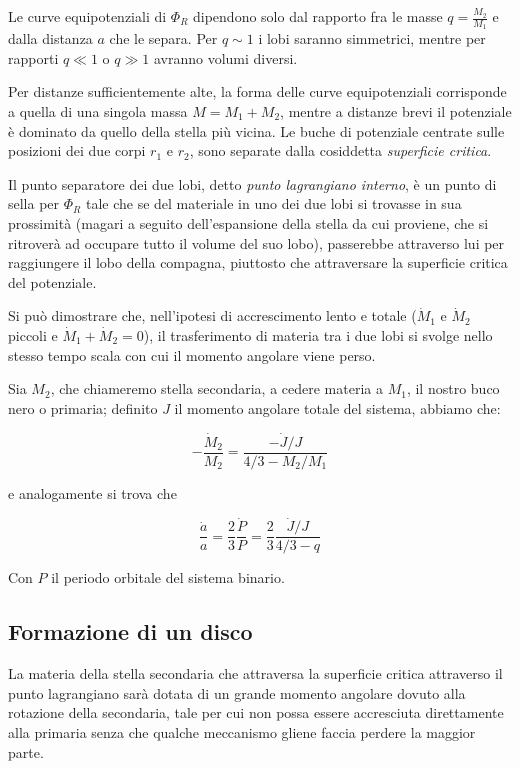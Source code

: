 \documentclass[a4paperbi]{article}
\begin{document}
	Le curve equipotenziali di $\Phi_R$ dipendono solo dal rapporto fra le masse $q=\frac{M_2}{M_1}$ e dalla distanza $a$ che le separa. Per $q\sim1$ i lobi saranno simmetrici, mentre per rapporti $q\ll1$ o $q\gg1$ avranno volumi diversi.

	Per distanze sufficientemente alte, la forma delle curve equipotenziali corrisponde a quella di una singola massa $M=M_1+M_2$, mentre a distanze brevi il potenziale è dominato da quello della stella più vicina. Le buche di potenziale centrate sulle posizioni dei due corpi $\textit{r}_1$ e $\textit{r}_2$, sono separate dalla cosiddetta \textit{superficie critica}.
	
	Il punto separatore dei due lobi, detto \textit{punto lagrangiano interno}, è un punto di sella per $\Phi_R$ tale che se del materiale in uno dei due lobi si trovasse in sua prossimità (magari a seguito dell'espansione della stella da cui proviene, che si ritroverà ad occupare tutto il volume del suo lobo), passerebbe attraverso lui per raggiungere il lobo della compagna, piuttosto che attraversare la superficie critica del potenziale.

	Si può dimostrare che, nell'ipotesi di accrescimento lento e totale ($\dot{M}_1$ e $\dot{M}_2$ piccoli e $\dot{M}_1+\dot{M}_2=0$), il trasferimento di materia tra i due lobi si svolge nello stesso tempo scala con cui il momento angolare viene perso.
	
	Sia $M_2$, che chiameremo stella secondaria, a cedere materia a $M_1$, il nostro buco nero o primaria; definito $J$ il momento angolare totale del sistema, abbiamo che:
	
	\begin{equation}
		-\frac{\dot{M}_2}{M_2}=\frac{-\dot{J}/J}{4/3-M_2/M_1}
	\end{equation}
	
	e analogamente si trova che

	\begin{equation}
		\frac{\dot{a}}{a}=\frac{2}{3}\frac{\dot{P}}{P}=\frac{2}{3}\frac{\dot{J}/J}{4/3-q}
	\end{equation}
	
	Con $P$ il periodo orbitale del sistema binario.
	
\subsection{Formazione di un disco}
	La materia della stella secondaria che attraversa la superficie critica attraverso il punto lagrangiano sarà dotata di un grande momento angolare dovuto alla rotazione della secondaria, tale per cui non possa essere accresciuta direttamente alla primaria senza che qualche meccanismo gliene faccia perdere la maggior parte.
	
\end{document}
